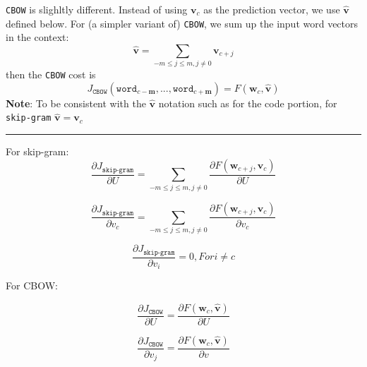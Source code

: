 \documentclass[letter,12pt]{article}
\begin{document}
\noindent \texttt{CBOW} is slighltly different. Instead of using ${\boldsymbol v}_{c}$ as the prediction vector, we use $\hat{\boldsymbol v}$ defined below. For (a simpler variant of) \texttt{CBOW}, we sum up the input word vectors in the context:\\
\begin{equation}
\hat{\boldsymbol v} = \sum_{-m\le j\le m, j\neq0}{\boldsymbol v}_{c+j}
\end{equation}
then the \texttt{CBOW} cost is 
\begin{equation}
J_{\texttt{CBOW}}(\texttt{word}_{c-\textbf{m}} ,...,\texttt{word}_{c+\textbf{m}}) = F({\boldsymbol w}_{c}, \hat{\boldsymbol v})
\end{equation}
\noindent\textbf{Note}: To be consistent with the $\hat{\boldsymbol v}$ notation such as for the code portion, for \texttt{skip-gram} $\hat{\boldsymbol v} = {\boldsymbol v_{c}}$

\vspace{5mm}
\noindent\rule{\textwidth}{0.4pt}\vspace{5mm}



\noindent For skip-gram:
\begin{equation}
\frac {\partial {J_{\texttt{skip-gram}}}} {\partial U}  =   \sum_{-m\le j\le m, j\neq0}\frac {\partial{ F({\boldsymbol w}_{c+j}, {\boldsymbol v}_{c})}}{\partial {U}} 
\end{equation}

\begin{equation}
\frac {\partial {J_{\texttt{skip-gram}}}} {\partial v_{c}}  =   \sum_{-m\le j\le m, j\neq0}\frac {\partial{ F({\boldsymbol w}_{c+j}, {\boldsymbol v}_{c})}}{\partial {v}_{c}} 
\end{equation}

\begin{equation}
\frac {\partial {J_{\texttt{skip-gram}}}} {\partial v_{i}}  =  0 , For i \neq c
\end{equation}




\noindent For CBOW:

\begin{equation}
\frac {\partial {J_{\texttt{CBOW}}}} {\partial U}  = \frac {\partial{ F({\boldsymbol w}_{c}, {\boldsymbol {\hat{v}}})}} {\partial {U}} 
\end{equation}

\begin{equation}
\frac {\partial {J_{\texttt{CBOW}}}} {\partial {v}_{j}}  = \frac {\partial{ F({\boldsymbol w}_{c}, {\boldsymbol {\hat{v}}})}} {\partial {v}} 
\end{equation}
\end{document}
